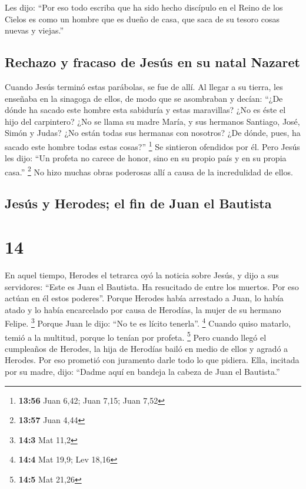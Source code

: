  Les dijo: ``Por eso todo escriba que ha sido hecho
discípulo en el Reino de los Cielos es como un hombre que es dueño de
casa, que saca de su tesoro cosas nuevas y viejas.''

\hypertarget{rechazo-y-fracaso-de-jesuxfas-en-su-natal-nazaret}{%
\subsection{Rechazo y fracaso de Jesús en su natal
Nazaret}\label{rechazo-y-fracaso-de-jesuxfas-en-su-natal-nazaret}}

 Cuando Jesús terminó estas parábolas, se fue de allí.
 Al llegar a su tierra, les enseñaba en la sinagoga de
ellos, de modo que se asombraban y decían: ``¿De dónde ha sacado este
hombre esta sabiduría y estas maravillas?  ¿No es éste el
hijo del carpintero? ¿No se llama su madre María, y sus hermanos
Santiago, José, Simón y Judas?  ¿No están todas sus
hermanas con nosotros? ¿De dónde, pues, ha sacado este hombre todas
estas cosas?'' \footnote{\textbf{13:56} Juan 6,42; Juan 7,15; Juan 7,52}
 Se sintieron ofendidos por él. Pero Jesús les dijo: ``Un
profeta no carece de honor, sino en su propio país y en su propia
casa.'' \footnote{\textbf{13:57} Juan 4,44}  No hizo
muchas obras poderosas allí a causa de la incredulidad de ellos.

\hypertarget{jesuxfas-y-herodes-el-fin-de-juan-el-bautista}{%
\subsection{Jesús y Herodes; el fin de Juan el
Bautista}\label{jesuxfas-y-herodes-el-fin-de-juan-el-bautista}}

\hypertarget{section-13}{%
\section{14}\label{section-13}}

 En aquel tiempo, Herodes el tetrarca oyó la noticia sobre
Jesús,  y dijo a sus servidores: ``Este es Juan el
Bautista. Ha resucitado de entre los muertos. Por eso actúan en él estos
poderes''.  Porque Herodes había arrestado a Juan, lo
había atado y lo había encarcelado por causa de Herodías, la mujer de su
hermano Felipe. \footnote{\textbf{14:3} Mat 11,2}  Porque
Juan le dijo: ``No te es lícito tenerla''. \footnote{\textbf{14:4} Mat
  19,9; Lev 18,16}  Cuando quiso matarlo, temió a la
multitud, porque lo tenían por profeta. \footnote{\textbf{14:5} Mat
  21,26}  Pero cuando llegó el cumpleaños de Herodes, la
hija de Herodías bailó en medio de ellos y agradó a Herodes.
 Por eso prometió con juramento darle todo lo que pidiera.
 Ella, incitada por su madre, dijo: ``Dadme aquí en
bandeja la cabeza de Juan el Bautista.''

